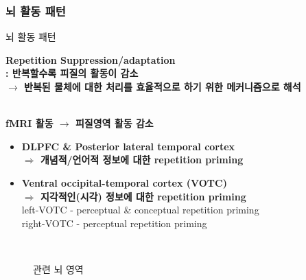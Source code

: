 \documentclass{beamer}
\begin{document}
\subsubsection{뇌 활동 패턴}
\begin{frame}{뇌 활동 패턴}
  \begin{itemize}
    \item \textbf{\color{blue} Repetition Suppression/adaptation\\: 반복할수록 피질의 활동이 감소}\\
      \textbf{$\rightarrow$ 반복된 물체에 대한 처리를 효율적으로 하기 위한 메커니즘으로 해석}\\~\\
        
    \begin{minipage}{0.85\textwidth}
    \item \textbf{fMRI 활동 $\longrightarrow$ 피질영역 활동 감소}\\
      \vspace{-1em}
      \begin{itemize}
        \item \textbf{DLPFC & Posterior lateral temporal cortex}\\
          \textbf{$\Rightarrow$ 개념적/언어적 정보에 대한 repetition priming}
        \item \textbf{Ventral occipital-temporal cortex (VOTC)}\\
          \textbf{$\Rightarrow$ 지각적인(시각) 정보에 대한 repetition priming}\\
          left-VOTC - perceptual \& conceptual repetition priming\\
          right-VOTC - perceptual repetition priming
      \end{itemize}
    \end{minipage}%
    \hspace{-16em}
    \begin{minipage}{0.4\textwidth}
      \begin{figure}
        \qquad
        \\
        \vspace{-1em}
        \vspace{-0.5em}
        \caption{관련 뇌 영역}
      \end{figure}
    \end{minipage}%


\end{itemize}
\end{frame}
\end{document}
